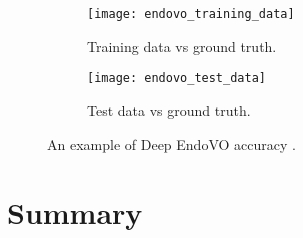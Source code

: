 \documentclass[thesis.tex]{subfiles}
\begin{document}
\begin{figure}[h] %
  \centering
  \begin{subfigure}[b]{0.4\linewidth}
    \centering
    \texttt{[image: endovo\_training\_data]}
    \caption{Training data vs ground truth.}
    \label{fig:endovo_training_data}
  \end{subfigure}
  \quad
  \begin{subfigure}[b]{0.4\linewidth}
    \centering
    \texttt{[image: endovo\_test\_data]}
    \caption{Test data vs ground truth.}
    \label{fig:endovo_test_data}
  \end{subfigure}
  \caption[An example of Deep EndoVO accuracy]{An example of Deep EndoVO accuracy \cite{DeepEndoVO18}.}
  \label{fig:deep_endovo_example}
\end{figure}



\section{Summary} \label{02summary}
\end{document}
